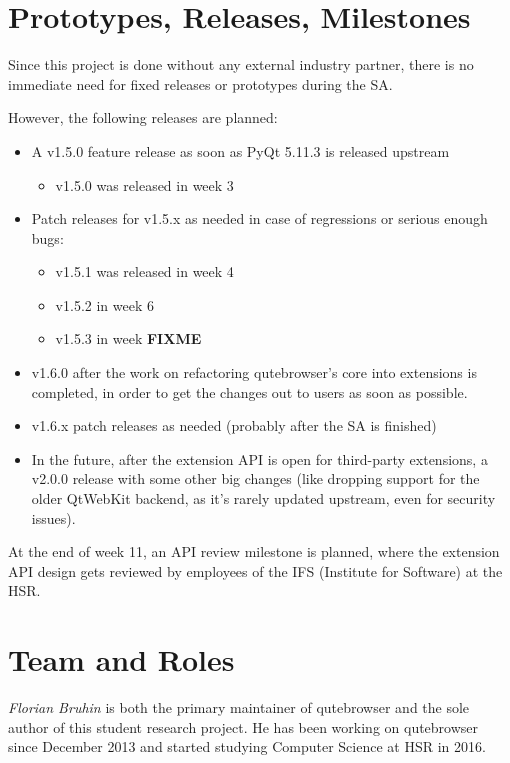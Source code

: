 \documentclass[a4paper,parskip=full]{scrreprt}
\newcommand{\fixme}[1]{\textbf{FIXME} \emph{#1}}
\begin{document}
\section{Prototypes, Releases, Milestones}
Since this project is done without any external industry partner, there is no
immediate need for fixed releases or prototypes during the SA.

However, the following releases are planned:

\begin{itemize}
  \item A v1.5.0 feature release as soon as PyQt 5.11.3 is released upstream
    \begin{itemize}
      \item v1.5.0 was released in week 3
    \end{itemize}
  \item Patch releases for v1.5.x as needed in case of regressions or serious
    enough bugs:
    \begin{itemize}
      \item v1.5.1 was released in week 4
      \item v1.5.2 in week 6
      \item v1.5.3 in week \fixme{}
    \end{itemize}
  \item v1.6.0 after the work on refactoring qutebrowser's core into extensions
    is completed, in order to get the changes out to users as soon as possible.
  \item v1.6.x patch releases as needed (probably after the SA is finished)
  \item In the future, after the extension API is open for third-party
    extensions, a v2.0.0 release with some other big changes (like dropping support
    for the older QtWebKit backend, as it's rarely updated upstream, even for
    security issues).
\end{itemize}

At the end of week 11, an API review milestone is planned, where the extension
API design gets reviewed by employees of the IFS (Institute for Software) at the
HSR.

\section{Team and Roles}
\emph{Florian Bruhin} is both the primary maintainer of qutebrowser and the
sole author of this student research project. He has been working on qutebrowser since
December 2013 and started studying Computer Science at HSR in 2016.
\end{document}
